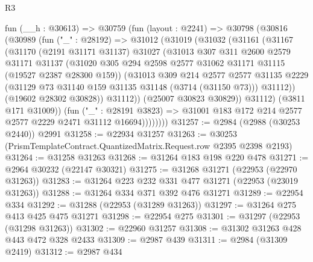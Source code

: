 \begin{lexlean}{R3}
\begin{coremodule}
          fun (__h : @30613) =>
          @30759
            (fun (layout : @2241) =>
            @30798
              (@30816
                (@30989
                  (fun ("_" : @28192) =>
                  @31012
                    (@31019
                      (@31032
                        (@31161
                          (@31167
                            (@31170
                              (@2191 @31171 @31137)
                              @31027
                              (@31013
                                @307
                                @311
                                @2600
                                @2579
                                @31171
                                @31137
                                (@31020
                                  @305
                                  @294
                                  @2598
                                  @2577
                                  @31062
                                  @31171
                                  @31115
                                  (@19527 @2387 @28300 @159))
                                (@31013
                                  @309
                                  @214
                                  @2577
                                  @2577
                                  @31135
                                  @2229
                                  (@31129 @73 @31140 @159 @31135 @31148 (@3714 (@31150 @73)))
                                  @31112))
                              (@19602 @28302 @30828))
                            @31112))
                        (@25007 @30823 @30829))
                      @31112)
                    (@3811 @171 @31009))
                  (fun ("_" : @28191 @3823) =>
                  @31001 @183 @172 @214 @2577 @2577 @2229 @2471 @31112 @16694))))))))
@31257 := @2984 (@2988 (@30253 @2440)) @2991
@31258 := @22934 @31257
@31263 := @30253 (PrismTemplateContract.QuantizedMatrix.Request.row @2395 @2398 @2193)
@31264 := @31258 @31263
@31268 := @31264 @183 @198 @220 @478
@31271 := @2964 @30232 (@22147 @30321)
@31275 := @31268 @31271 (@22953 (@22970 @31263))
@31283 := @31264 @223 @232 @331 @477 @31271 (@22953 (@23019 @31263))
@31288 := @31264 @334 @371 @392 @476 @31271
@31289 := @22954 @334
@31292 := @31288 (@22953 (@31289 @31263))
@31297 := @31264 @275 @413 @425 @475 @31271
@31298 := @22954 @275
@31301 := @31297 (@22953 (@31298 @31263))
@31302 := @22960 @31257
@31308 := @31302 @31263 @428 @443 @472 @328 @2433
@31309 := @2987 @439
@31311 := @2984 (@31309 @2419)
@31312 := @2987 @434

\end{coremodule}
\end{lexlean}
